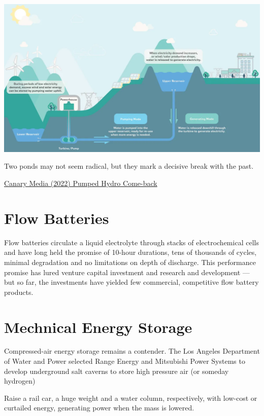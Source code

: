 \documentclass[
]{book}
\begin{document}
\includegraphics{fig/pumped_hydro.png}

Two ponds may not seem radical, but they mark a decisive break with the past.

\href{https://www.canarymedia.com/articles/long-duration-energy-storage/pumped-hydro-grid-storage-could-be-poised-for-a-comeback}{Canary Media (2022) Pumped Hydro Come-back}

\hypertarget{flow-batteries-1}{%
\section{Flow Batteries}\label{flow-batteries-1}}

Flow batteries circulate a liquid electrolyte through stacks of electrochemical cells and have long held the promise of 10-hour durations, tens of thousands of cycles, minimal degradation and no limitations on depth of discharge. This performance promise has lured venture capital investment and research and development --- but so far, the investments have yielded few commercial, competitive flow battery products.

\hypertarget{mechnical-energy-storage}{%
\section{Mechnical Energy Storage}\label{mechnical-energy-storage}}

Compressed-air energy storage remains a contender. The Los Angeles Department of Water and Power selected Range Energy and Mitsubishi Power Systems to develop underground salt caverns to store high pressure air (or someday hydrogen)

Raise a rail car, a huge weight and a water column, respectively, with low-cost or curtailed energy, generating power when the mass is lowered.
\end{document}
